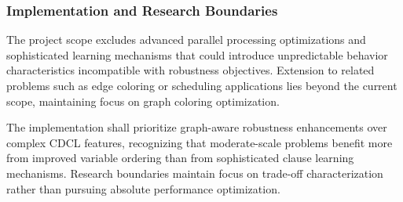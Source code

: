 \subsubsection{Implementation and Research Boundaries}
The project scope excludes advanced parallel processing optimizations and sophisticated learning mechanisms that could introduce unpredictable behavior characteristics incompatible with robustness objectives. Extension to related problems such as edge coloring or scheduling applications lies beyond the current scope, maintaining focus on graph coloring optimization.

The implementation shall prioritize graph-aware robustness enhancements over complex CDCL features, recognizing that moderate-scale problems benefit more from improved variable ordering than from sophisticated clause learning mechanisms. Research boundaries maintain focus on trade-off characterization rather than pursuing absolute performance optimization.